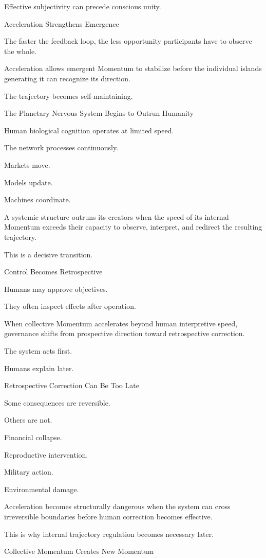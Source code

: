 Effective subjectivity can precede conscious unity.

Acceleration Strengthens Emergence

The faster the feedback loop, the less opportunity participants have to observe the whole.

Acceleration allows emergent Momentum to stabilize before the individual islands generating it can recognize its direction.

The trajectory becomes self-maintaining.

The Planetary Nervous System Begins to Outrun Humanity

Human biological cognition operates at limited speed.

The network processes continuously.

Markets move.

Models update.

Machines coordinate.

A systemic structure outruns its creators when the speed of its internal Momentum exceeds their capacity to observe, interpret, and redirect the resulting trajectory.

This is a decisive transition.

Control Becomes Retrospective

Humans may approve objectives.

They often inspect effects after operation.

When collective Momentum accelerates beyond human interpretive speed, governance shifts from prospective direction toward retrospective correction.

The system acts first.

Humans explain later.

Retrospective Correction Can Be Too Late

Some consequences are reversible.

Others are not.

Financial collapse.

Reproductive intervention.

Military action.

Environmental damage.

Acceleration becomes structurally dangerous when the system can cross irreversible boundaries before human correction becomes effective.

This is why internal trajectory regulation becomes necessary later.

Collective Momentum Creates New Momentum

